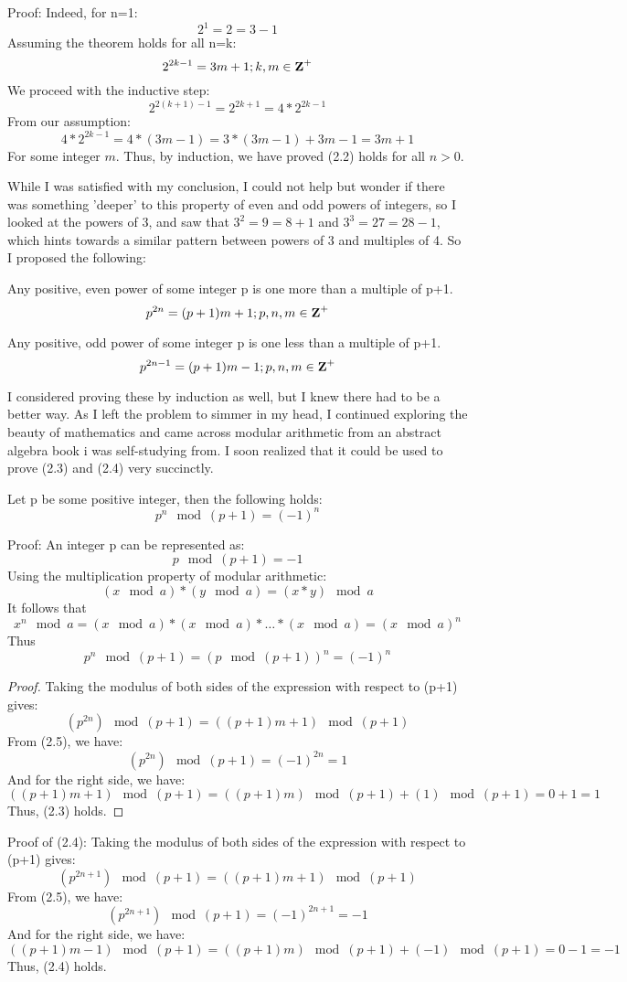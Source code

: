 Proof: Indeed, for n=1:
$$2^1=2=3-1$$
Assuming the theorem holds for all n=k:
$$2^{2k-1}=3m+1;k,m\in\mbox{\textbf{Z}}^+$$
We proceed with the inductive step:
$$2^{2(k+1)-1}=2^{2k+1}=4*2^{2k-1}$$
From our assumption:
$$4*2^{2k-1}=4*(3m-1)=3*(3m-1)+3m-1=3m+1$$
For some integer $m$. Thus, by induction, we have proved (2.2) holds for all $n>0$.

While I was satisfied with my conclusion, I could not help but wonder if there was something 'deeper' to this property of even and odd powers of integers, so I looked at the powers of 3, and saw that $3^2=9=8+1$ and $3^3=27=28-1$, which hints towards a similar pattern between powers of 3 and multiples of 4. So I proposed the following:

\begin{theorem}
    Any positive, even power of some integer \mbox{p} is one more than a multiple of \mbox{p+1}. 
    $$p^{2n}=(p+1)m+1;p,n,m\in\mbox{\textbf{Z}}^+$$
\end{theorem}

\begin{theorem}
    Any positive, odd power of some integer \mbox{p} is one less than a multiple of \mbox{p+1}. 
    $$p^{2n-1}=(p+1)m-1;p,n,m\in\mbox{\textbf{Z}}^+$$
\end{theorem}

I considered proving these by induction as well, but I knew there had to be a better way. As I left the problem to simmer in my head, I continued exploring the beauty of mathematics and came across modular arithmetic from an abstract algebra book i was self-studying from. I soon realized that it could be used to prove (2.3) and (2.4) very succinctly.
\begin{theorem}
    Let \mbox{p} be some positive integer, then the following holds:
    $$p^n\mod{(p+1)}=(-1)^n$$
\end{theorem}
Proof: An integer p can be represented as:
$$p\mod{(p+1)}=-1$$
Using the multiplication property of modular arithmetic:
$$(x\mod{a})*(y\mod{a})=(x*y)\mod{a}$$
It follows that 
$$x^n\mod{a}=(x\mod{a})*(x\mod{a})*\dots*(x\mod{a})=(x\mod{a})^n$$
Thus 
$$p^n\mod{(p+1)}=(p\mod{(p+1)})^n=(-1)^n$$

\begin{proof} 
Taking the modulus of both sides of the expression with respect to (p+1) gives:
$$(p^{2n})\mod{(p+1)}=((p+1)m+1)\mod{(p+1)}$$
From (2.5), we have:
$$(p^{2n})\mod{(p+1)}=(-1)^{2n}=1$$
And for the right side, we have:
$$((p+1)m+1)\mod{(p+1)}=((p+1)m)\mod{(p+1)}+(1)\mod{(p+1)}=0+1=1$$
Thus, (2.3) holds.
\end{proof}

Proof of (2.4): Taking the modulus of both sides of the expression with respect to (p+1) gives:
$$(p^{2n+1})\mod{(p+1)}=((p+1)m+1)\mod{(p+1)}$$
From (2.5), we have:
$$(p^{2n+1})\mod{(p+1)}=(-1)^{2n+1}=-1$$
And for the right side, we have:
$$((p+1)m-1)\mod{(p+1)}=((p+1)m)\mod{(p+1)}+(-1)\mod{(p+1)}=0-1=-1$$
Thus, (2.4) holds.